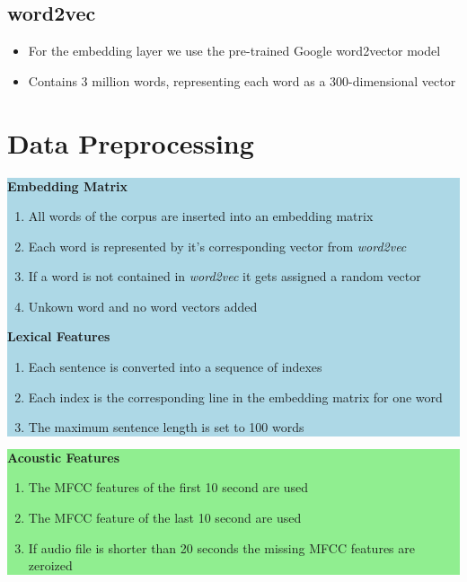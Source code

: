 \documentclass[a0,landscape]{a0poster}
\begin{document}
\begin{multicols}{3}
\subsection*{word2vec}
\begin{itemize}
	\item For the embedding layer we use the pre-trained Google word2vector model
	\item Contains 3 million words, representing each word as a 300-dimensional vector
\end{itemize}

\large
\section*{Data Preprocessing}
\colorbox{lightblue}{
	\parbox{1025pt}{
		\vspace{0.5cm}
		{\LARGE \textbf{Embedding Matrix}}
		\begin{enumerate}
			\item All words of the corpus are inserted into an embedding matrix
			\item Each word is represented by it's corresponding vector from \textit{word2vec}
			\item If a word is not contained in \textit{word2vec} it gets assigned a random vector
			\item Unkown word and no word vectors added
		\end{enumerate}
		\vspace{0.5cm}
		{\LARGE \textbf{Lexical Features}}
		\begin{enumerate}	
			\item Each sentence is converted into a sequence of indexes
			\item Each index is the corresponding line in the embedding matrix for one word
			\item The maximum sentence length is set to 100 words
		\end{enumerate}
}}
\colorbox{lightgreen}{
	\parbox{1025pt}{
		\vspace{0.5cm}
		{\LARGE \textbf{Acoustic Features}}
		\begin{enumerate}
			\item The MFCC features of the first 10 second are used
			\item The MFCC feature of the last 10 second are used 
			\item If audio file is shorter than 20 seconds the missing MFCC features are zeroized
		\end{enumerate}
	}}


\end{multicols}
\end{document}
